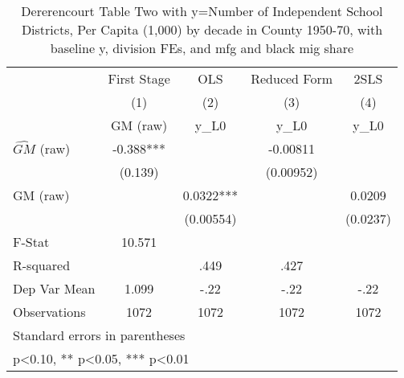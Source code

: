 \begin{table}[htbp]\centering
\def\sym#1{\ifmmode^{#1}\else\(^{#1}\)\fi}
\caption{Dererencourt Table Two with y=Number of Independent School Districts, Per Capita (1,000) by decade in County 1950-70, with baseline y, division FEs, and mfg and black mig share}
\begin{tabular}{l*{4}{c}}
\toprule
                    & First Stage   &         OLS   &Reduced Form   &        2SLS   \\
                    &\multicolumn{1}{c}{(1)}&\multicolumn{1}{c}{(2)}&\multicolumn{1}{c}{(3)}&\multicolumn{1}{c}{(4)}\\
                    &\multicolumn{1}{c}{GM  (raw)}&\multicolumn{1}{c}{y\_L0}&\multicolumn{1}{c}{y\_L0}&\multicolumn{1}{c}{y\_L0}\\
\midrule
$\hat{GM}$ (raw)    &      -0.388***&               &    -0.00811   &               \\
                    &     (0.139)   &               &   (0.00952)   &               \\
\addlinespace
GM  (raw)           &               &      0.0322***&               &      0.0209   \\
                    &               &   (0.00554)   &               &    (0.0237)   \\
\midrule
F-Stat              &      10.571   &               &               &               \\
R-squared           &               &        .449   &        .427   &               \\
Dep Var Mean        &       1.099   &        -.22   &        -.22   &        -.22   \\
Observations        &        1072   &        1072   &        1072   &        1072   \\
\bottomrule
\multicolumn{5}{l}{\footnotesize Standard errors in parentheses}\\
\multicolumn{5}{l}{\footnotesize * p<0.10, ** p<0.05, *** p<0.01}\\
\end{tabular}
\end{table}

